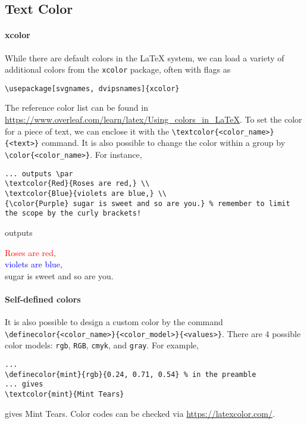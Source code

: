 \subsection{Text Color}

\paragraph{xcolor}
While there are default colors in the \LaTeX{} system, we can load a variety of additional colors from the \verb|xcolor| package, often with flags as
\begin{lstlisting}
\usepackage[svgnames, dvipsnames]{xcolor}    
\end{lstlisting}
The reference color list can be found in \href{https://www.overleaf.com/learn/latex/Using_colors_in_LaTeX}{https://www.overleaf.com/learn/latex/\allowbreak Using\_colors\_in\_LaTeX}. To set the color for a piece of text, we can enclose it with the \texttt{\textbackslash textcolor\{<color\_name>\}\{<text>\}} command. It is also possible to change the color within a group by \texttt{\textbackslash color\{<color\_name>\}}. For instance,
\begin{lstlisting}
... outputs \par
\textcolor{Red}{Roses are red,} \\
\textcolor{Blue}{violets are blue,} \\ 
{\color{Purple} sugar is sweet and so are you.} % remember to limit the scope by the curly brackets!
\end{lstlisting}
outputs \par
\textcolor{Red}{Roses are red,} \\
\textcolor{Blue}{violets are blue,} \\ 
{\color{Purple} sugar is sweet and so are you.}

\paragraph{Self-defined colors}
It is also possible to design a custom color by the command \texttt{\textbackslash definecolor\{<color\_name>\}\{<color\_model>\}\{<values>\}}. There are $4$ possible color models: \verb|rgb|, \verb|RGB|, \verb|cmyk|, and \verb|gray|. For example,
\begin{lstlisting}
...
\definecolor{mint}{rgb}{0.24, 0.71, 0.54} % in the preamble
... gives
\textcolor{mint}{Mint Tears}
\end{lstlisting}
gives \textcolor{mint}{Mint Tears}. Color codes can be checked via \href{https://latexcolor.com/}{https://latexcolor.com/}.\par

